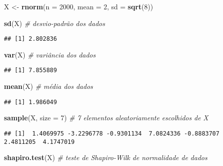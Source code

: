 \documentclass[
]{article}
\newenvironment{Shaded}{\begin{snugshade}}{\end{snugshade}}
\newcommand{\CommentTok}[1]{\textcolor[rgb]{0.56,0.35,0.01}{\textit{#1}}}
\newcommand{\DataTypeTok}[1]{\textcolor[rgb]{0.13,0.29,0.53}{#1}}
\newcommand{\DecValTok}[1]{\textcolor[rgb]{0.00,0.00,0.81}{#1}}
\newcommand{\KeywordTok}[1]{\textcolor[rgb]{0.13,0.29,0.53}{\textbf{#1}}}
\newcommand{\NormalTok}[1]{#1}
\newcommand{\StringTok}[1]{\textcolor[rgb]{0.31,0.60,0.02}{#1}}
\begin{document}
\begin{Shaded}
\begin{Highlighting}[]
\NormalTok{X <-}\StringTok{ }\KeywordTok{rnorm}\NormalTok{(}\DataTypeTok{n =} \DecValTok{2000}\NormalTok{,}
          \DataTypeTok{mean =} \DecValTok{2}\NormalTok{,}
          \DataTypeTok{sd =} \KeywordTok{sqrt}\NormalTok{(}\DecValTok{8}\NormalTok{))}

\KeywordTok{sd}\NormalTok{(X) }\CommentTok{# desvio-padrão dos dados}
\end{Highlighting}
\end{Shaded}

\begin{verbatim}
## [1] 2.802836
\end{verbatim}

\begin{Shaded}
\begin{Highlighting}[]
\KeywordTok{var}\NormalTok{(X) }\CommentTok{# variância dos dados}
\end{Highlighting}
\end{Shaded}

\begin{verbatim}
## [1] 7.855889
\end{verbatim}

\begin{Shaded}
\begin{Highlighting}[]
\KeywordTok{mean}\NormalTok{(X) }\CommentTok{# média dos dados}
\end{Highlighting}
\end{Shaded}

\begin{verbatim}
## [1] 1.986049
\end{verbatim}

\begin{Shaded}
\begin{Highlighting}[]
\KeywordTok{sample}\NormalTok{(X, }\DataTypeTok{size =} \DecValTok{7}\NormalTok{) }\CommentTok{# 7 elementos aleatoriamente escolhidos de X}
\end{Highlighting}
\end{Shaded}

\begin{verbatim}
## [1]  1.4069975 -3.2296778 -0.9301134  7.0824336 -0.8883707  2.4811205  4.1747019
\end{verbatim}

\begin{Shaded}
\begin{Highlighting}[]
\KeywordTok{shapiro.test}\NormalTok{(X) }\CommentTok{# teste de Shapiro-Wilk de normalidade de dados}
\end{Highlighting}
\end{Shaded}
\end{document}
